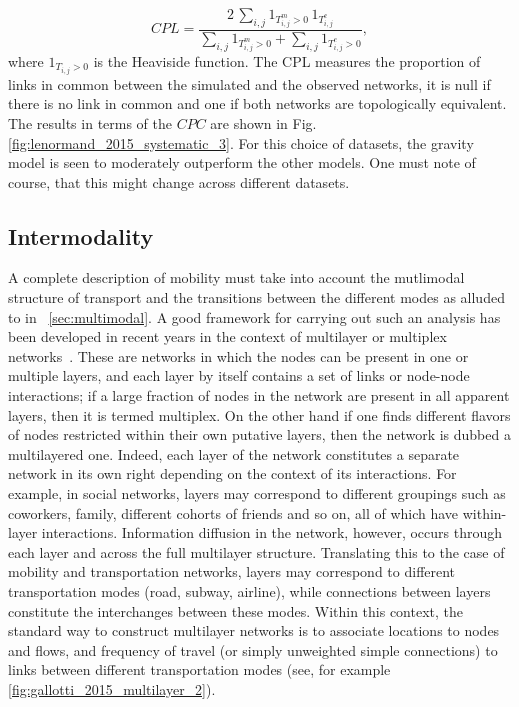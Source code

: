 \begin{equation}
CPL = \frac{2 \, \sum_{i,j} 1_{T^m_{i,j} > 0} \, 1_{T^e_{i,j}}}{\sum_{i,j} 1_{T^m_{i,j} > 0} + \sum_{i,j} 1_{T^e_{i,j} > 0}} ,
\end{equation}
where $1_{T_{i,j} > 0}$ is the Heaviside function. The CPL measures the proportion of links in common between
the simulated and the observed networks, it is null if there is no link in common and one if both networks are topologically
equivalent. The results in terms of the $CPC$ are shown in Fig. \ref{fig:lenormand_2015_systematic_3}. For this choice of datasets,  the gravity model is seen to moderately outperform the other models. One must note of course, that this might change across different datasets.

\subsection{Intermodality}
\label{sec:intermodal}

A complete description of mobility must take into account the mutlimodal structure of transport and the transitions between the different modes as alluded to in \sectionname~\ref{sec:multimodal}. A good framework for carrying out such an analysis has been developed in recent years in the context of multilayer or multiplex networks~\cite{boccaletti_2014_structure,kivela_2014_multilayer}. These are networks in which the nodes can be present in one or multiple layers, and each layer by itself contains a set of links or node-node interactions; if a large fraction of nodes in the network are present in all apparent layers, then it is termed multiplex. On the other hand if one finds different flavors of nodes restricted within their own putative layers, then the network is dubbed a multilayered one. Indeed, each layer of the network constitutes a separate network in its own right depending on the context of its interactions. For example, in social networks, layers may correspond to different groupings such as coworkers, family, different cohorts of friends and so on, all of which have within-layer interactions. Information diffusion in the network, however, occurs through each layer and across the full multilayer structure. Translating this to the case of mobility and transportation networks, layers may correspond to different transportation modes (road, subway, airline), while connections between layers constitute the interchanges between these modes. Within this context, the standard way to construct multilayer networks is to associate locations to nodes and flows, and frequency of travel (or simply unweighted simple connections) to links between different transportation modes (see, for example \figurename~ \ref{fig:gallotti_2015_multilayer_2}).



